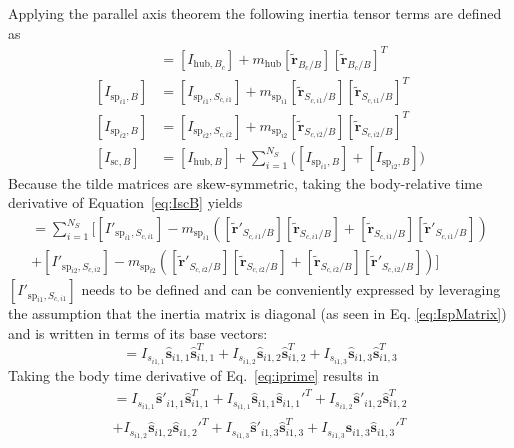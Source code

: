 Applying the parallel axis theorem the following inertia tensor terms are defined as
\begin{align}
	[I_{\text{hub},B}] &= [I_{\text{hub},B_c}] + m_{\text{hub}}[\bm{\tilde{r}}_{B_c/B}] [\bm{\tilde{r}}_{B_c/B}]^T
	\label{eq:IHubB}
	\\
	[I_{\text{sp}_{i1},B}] &= [I_{\text{sp}_{i1},S_{c,i1}}] + m_{\text{sp}_{i1}}[\bm{\tilde{r}}_{S_{c,i1}/B}] [\bm{\tilde{r}}_{S_{c,{i1}}/B}]^T
	\\
	[I_{\text{sp}_{i2},B}] &= [I_{\text{sp}_{i2},S_{c,i2}}] + m_{\text{sp}_{i2}}[\bm{\tilde{r}}_{S_{c,i2}/B}] [\bm{\tilde{r}}_{S_{c,{i2}}/B}]^T
	\\
	[I_{\text{sc},B}] &= [I_{\text{hub},B}] + \sum\limits_{i=1}^{N_S}\Big( [I_{\text{sp}_{i1},B}] + [I_{\text{sp}_{i2},B}]\Big)
	\label{eq:IscB}
\end{align}
Because the tilde matrices are skew-symmetric, taking the body-relative time derivative of Equation~\eqref{eq:IscB} yields
\begin{multline}
	[I'_{\text{sc},B}] = \sum\limits_{i=1}^{N_S} \Big[[I'_{\text{sp}_{i1},S_{c,i1}}] - m_{\text{sp}_{i1}}\left([\bm{\tilde{r}}'_{S_{c,{i1}}/B}] [\bm{\tilde{r}}_{S_{c,{i1}}/B}] + [\bm{\tilde{r}}_{S_{c,{i1}}/B}] [\bm{\tilde{r}}'_{S_{c,{i1}}/B}]\right)\\
	+[I'_{\text{sp}_{i2},S_{c,i2}}] - m_{\text{sp}_{i2}}\left([\bm{\tilde{r}}'_{S_{c,{i2}}/B}] [\bm{\tilde{r}}_{S_{c,{i2}}/B}] + [\bm{\tilde{r}}_{S_{c,{i2}}/B}] [\bm{\tilde{r}}'_{S_{c,{i2}}/B}]\right)\Big]
	\label{eq:IprimeScB}
\end{multline}
$[I'_{\text{sp}_{i1},S_{c,i1}}]$ needs to be defined and can be conveniently expressed by leveraging the assumption that the inertia matrix is diagonal (as seen in Eq. \eqref{eq:IspMatrix}) and is written in terms of its base vectors:
\begin{equation}
	[I_{\text{sp}_{i1},S_{c,i1}}] = I_{s_{i1,1}}\hat{\bm s}_{i1,1}\hat{\bm s}_{i1,1}^{T}+I_{s_{i1,2}}\hat{\bm s}_{i1,2}\hat{\bm s}_{i1,2}^{T}+I_{s_{i1,3}}\hat{\bm s}_{i1,3}\hat{\bm s}_{i1,3}^{T}
	\label{eq:iprime}
\end{equation}
Taking the body time derivative of Eq.~\eqref{eq:iprime} results in
\begin{multline}
	[I'_{\text{sp}_{i1},S_{c,i1}}] = I_{s_{i1,1}}\hat{\bm s}'_{i1,1}\hat{\bm s}_{i1,1}^{T}+I_{s_{i1,1}}\hat{\bm s}_{i1,1}\hat{\bm s}_{i1,1}'^{T}+I_{s_{i1,2}}\hat{\bm s}'_{i1,2}\hat{\bm s}_{i1,2}^{T}\\
	+I_{s_{i1,2}}\hat{\bm s}_{i1,2}\hat{\bm s}_{i1,2}'^{T}+I_{s_{i1,3}}\hat{\bm s}'_{i1,3}\hat{\bm s}_{i1,3}^{T}+I_{s_{i1,3}}\hat{\bm s}_{i1,3}\hat{\bm s}_{i1,3}'^{T}
	\label{eq:iprime2}
\end{multline}
